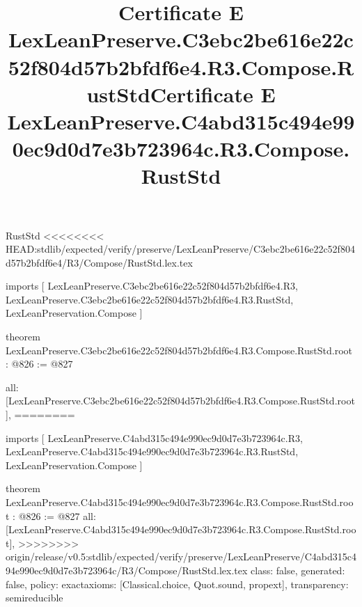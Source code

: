 \begin{lexlean}{RustStd}
<<<<<<<< HEAD:stdlib/expected/verify/preserve/LexLeanPreserve/C3ebc2be616e22c52f804d57b2bfdf6e4/R3/Compose/RustStd.lex.tex
\title{Certificate E LexLeanPreserve.C3ebc2be616e22c52f804d57b2bfdf6e4.R3.Compose.RustStd}
\begin{coremodule}
imports [
  LexLeanPreserve.C3ebc2be616e22c52f804d57b2bfdf6e4.R3,
  LexLeanPreserve.C3ebc2be616e22c52f804d57b2bfdf6e4.R3.RustStd,
  LexLeanPreservation.Compose
]

theorem LexLeanPreserve.C3ebc2be616e22c52f804d57b2bfdf6e4.R3.Compose.RustStd.root : @826 := @827 {
  all: [LexLeanPreserve.C3ebc2be616e22c52f804d57b2bfdf6e4.R3.Compose.RustStd.root],
========
\title{Certificate E LexLeanPreserve.C4abd315c494e990ec9d0d7e3b723964c.R3.Compose.RustStd}
\begin{coremodule}
imports [
  LexLeanPreserve.C4abd315c494e990ec9d0d7e3b723964c.R3,
  LexLeanPreserve.C4abd315c494e990ec9d0d7e3b723964c.R3.RustStd,
  LexLeanPreservation.Compose
]

theorem LexLeanPreserve.C4abd315c494e990ec9d0d7e3b723964c.R3.Compose.RustStd.root : @826 := @827 {
  all: [LexLeanPreserve.C4abd315c494e990ec9d0d7e3b723964c.R3.Compose.RustStd.root],
>>>>>>>> origin/release/v0.5:stdlib/expected/verify/preserve/LexLeanPreserve/C4abd315c494e990ec9d0d7e3b723964c/R3/Compose/RustStd.lex.tex
  class: false,
  generated: false,
  policy: exact{axioms: [Classical.choice, Quot.sound, propext]},
  transparency: semireducible
}


\end{coremodule}}
\end{coremodule}
\end{lexlean}
